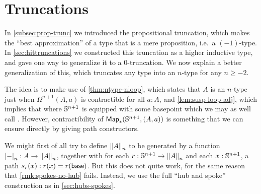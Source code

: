 

\section{Truncations}
\label{sec:truncations}

In \autoref{subsec:prop-trunc} we introduced the propositional truncation, which makes the ``best approximation'' of a type that is a mere
proposition, i.e.\ a $(-1)$-type.
In \autoref{sec:hittruncations} we constructed this truncation as a higher inductive type, and gave one way to generalize it to a
0-truncation.
We now explain a better generalization of this, which truncates any type into an $n$-type for any $n\geq -2$.

The idea is to make use of \autoref{thm:ntype-nloop}, which states that $A$ is an $n$-type just when $\Omega^{n+1}(A,a)$ is contractible for
all $a:A$, and \autoref{lem:susp-loop-adj}, which implies that
 where $\Sn^{n+1}$ is equipp\-ed with some basepoint which we may as well call \base.
However, contractibility of $\Map_*(\Sn^{n+1},(A,a))$ is something that we can ensure directly by giving path constructors.

We might first of all try to define $\trunc nA$ to be generated by a function $\tproj n- : A \to \trunc n A$, together with for each
$r:\Sn^{n+1} \to \trunc n A$ and each $x:\Sn^{n+1}$, a path $s_r(x):r(x) = r(\base)$.
%
But this does not quite work, for the same reason that \autoref{rmk:spokes-no-hub} fails.
Instead, we use the full ``hub and spoke'' construction as in \autoref{sec:hubs-spokes}.

